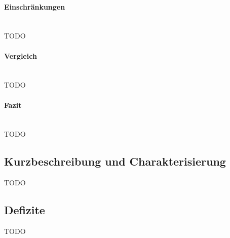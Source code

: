 \paragraph{Einschränkungen}~\\

TODO

\paragraph{Vergleich}~\\

TODO

\paragraph{Fazit}~\\

TODO

\subsection{Kurzbeschreibung und Charakterisierung}
\label{sub:Kurzbeschreibung und Charakterisierung}
TODO

\subsection{Defizite}
\label{sub:Defizite}
TODO
